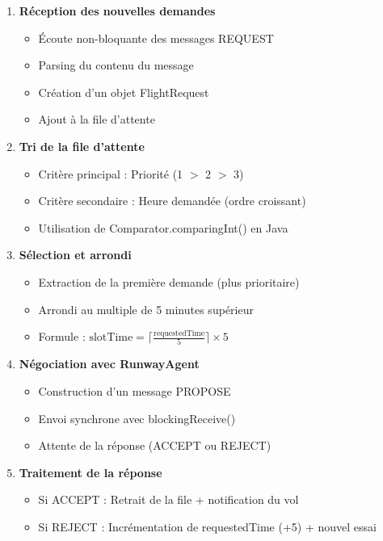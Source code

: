 \documentclass[12pt,a4paper]{article}
\begin{document}
\begin{enumerate}[leftmargin=*, label=\textcolor{primaryblue}{\arabic*.}]
    \item \textbf{Réception des nouvelles demandes}
    \begin{itemize}
        \item Écoute non-bloquante des messages REQUEST
        \item Parsing du contenu du message
        \item Création d'un objet FlightRequest
        \item Ajout à la file d'attente
    \end{itemize}

    \item \textbf{Tri de la file d'attente}
    \begin{itemize}
        \item Critère principal : Priorité (1 $>$ 2 $>$ 3)
        \item Critère secondaire : Heure demandée (ordre croissant)
        \item Utilisation de Comparator.comparingInt() en Java
    \end{itemize}

    \item \textbf{Sélection et arrondi}
    \begin{itemize}
        \item Extraction de la première demande (plus prioritaire)
        \item Arrondi au multiple de 5 minutes supérieur
        \item Formule : $\text{slotTime} = \lceil \frac{\text{requestedTime}}{5} \rceil \times 5$
    \end{itemize}

    \item \textbf{Négociation avec RunwayAgent}
    \begin{itemize}
        \item Construction d'un message PROPOSE
        \item Envoi synchrone avec blockingReceive()
        \item Attente de la réponse (ACCEPT ou REJECT)
    \end{itemize}

    \item \textbf{Traitement de la réponse}
    \begin{itemize}
        \item Si ACCEPT : Retrait de la file + notification du vol
        \item Si REJECT : Incrémentation de requestedTime (+5) + nouvel essai
    \end{itemize}
\end{enumerate}
\end{document}
